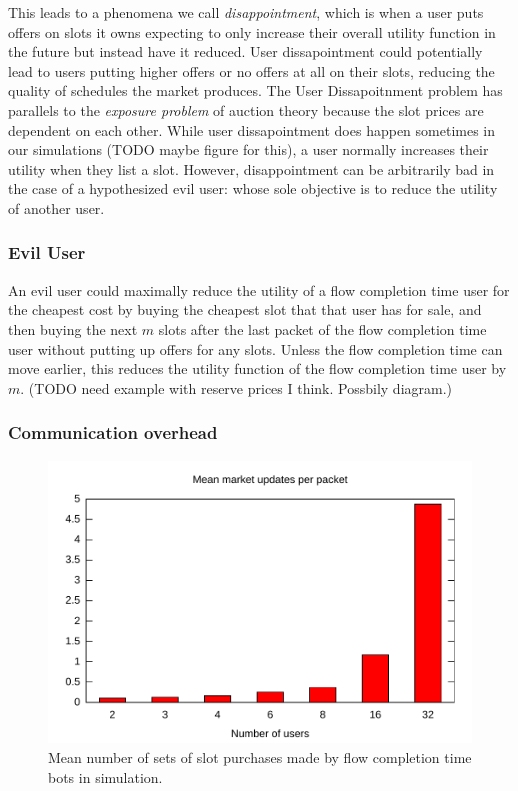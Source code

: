 This leads to a phenomena we call \emph{disappointment}, which is when a user puts offers on slots it owns expecting to only increase their overall utility function in the future but instead have it reduced. User dissapointment could potentially lead to users putting higher offers or no offers at all on their slots, reducing the quality of schedules the market produces.
The User Dissapoitnment problem has parallels to the \emph{exposure problem} of auction theory \cite{milgrom00, englmaier06} because the slot prices are dependent on each other.
While user dissapointment does happen sometimes in our simulations (TODO maybe figure for this), a user normally increases their utility when they list a slot.
However, disappointment can be arbitrarily bad in the case of a hypothesized evil user: whose sole objective is to reduce the utility of another user.
\subsubsection{Evil User}
An evil user could maximally reduce the utility of a flow completion time user for the cheapest cost by buying the cheapest slot that that user has for sale, and then buying the next $m$ slots after the last packet of the flow completion time user without putting up offers for any slots. Unless the flow completion time can move earlier, this reduces the utility function of the flow completion time user by $m$. (TODO need example with reserve prices I think. Possbily diagram.)

\subsubsection{Communication overhead}

\begin{figure}
\includegraphics[width=\columnwidth]{plots/num_market_updates.pdf}
\caption{Mean number of sets of slot purchases made by flow completion time bots in simulation.}
\label{f:num_market_updates}
\end{figure}

